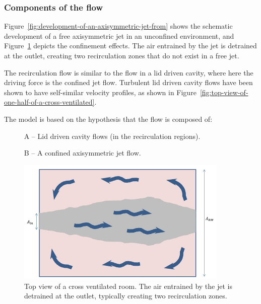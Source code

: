 {\subsubsection{Components of the flow}\label{components-of-the-flow}

Figure~\ref{fig:development-of-an-axisymmetric-jet-from} shows the schematic development of a free axisymmetric jet in an unconfined environment, and Figure~\ref{fig:top-view-of-a-cross-ventilated-room.-the-air} depicts the confinement effects. The air entrained by the jet is detrained at the outlet, creating two recirculation zones that do not exist in a free jet.

The recirculation flow is similar to the flow in a lid driven cavity, where here the driving force is the confined jet flow. Turbulent lid driven cavity flows have been shown to have self-similar velocity profiles, as shown in Figure~\ref{fig:top-view-of-one-half-of-a-cross-ventilated}.

The model is based on the hypothesis that the flow is composed of:

~~~~~ A -- Lid driven cavity flows (in the recirculation regions).

~~~~~ B -- A confined axisymmetric jet flow.

\begin{figure}[hbtp] %
\centering
\includegraphics[width=0.9\textwidth, height=0.9\textheight, keepaspectratio=true]{media/image2623.png}
\caption{Top view of a cross ventilated room. The air entrained by the jet is detrained at the outlet, typically creating two recirculation zones. \protect \label{fig:top-view-of-a-cross-ventilated-room.-the-air}}
\end{figure}

}
